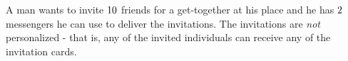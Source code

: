 



\SUBTRACT\va\vb\vf
\DIVIDE\va\vb\vg
\SUBTRACT\va\vg\vh
\SUBTRACT\vh\vg\vi

\question A man wants to invite $10$ friends for a get-together at his place and he has 
$2$ messengers he can use to deliver the invitations. The invitations are \textit{not}
personalized - that is, any of the invited individuals can receive any of the invitation cards.

\watchout

